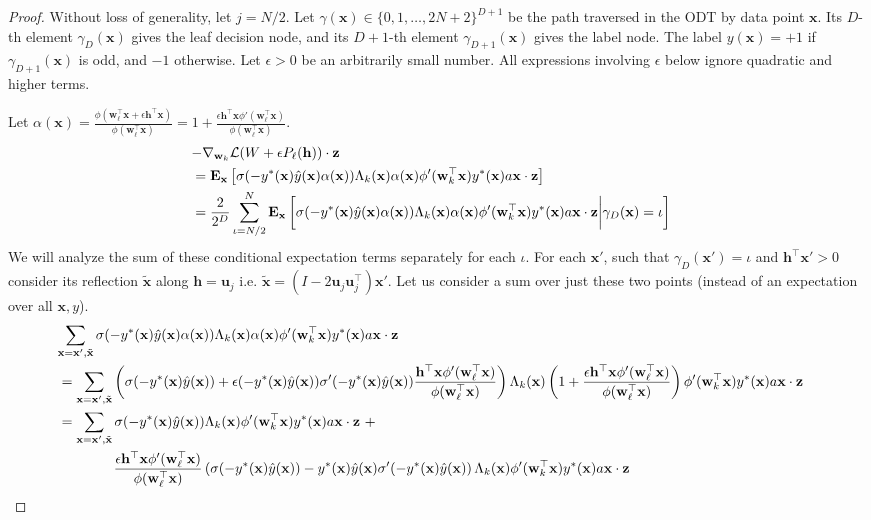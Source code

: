 \documentclass{article}
\theoremstyle{plain}
\theoremstyle{definition}
\theoremstyle{remark}
\newcommand{\E}{{\mathbf E}}
\newcommand{\1}{{\mathbf 1}}
\newcommand{\0}{{\mathbf 0}}
\newcommand{\h}{{\mathbf h}}
\newcommand{\z}{{\mathbf z}}
\newcommand{\w}{{\mathbf w}}
\newcommand{\x}{{\mathbf x}}
\newcommand{\bu}{{\mathbf u}}
\renewcommand{\>}{{\rightarrow}}
\begin{document}
\label{app:second_order_lens}
\begin{proof}
Without loss of generality, let $j=N/2$. Let $\gamma(\x) \in \{0,1,\ldots,2N+2\}^{D+1}$ be the path traversed in the ODT by data point $\x$. Its $D$-th element $\gamma_D(\x)$ gives the leaf decision node, and its $D+1$-th element $\gamma_{D+1}(\x)$ gives the label node. The label $y(\x) =  +1$ if $\gamma_{D+1}(\x)$ is odd, and $-1$ otherwise. Let $\epsilon>0$ be an arbitrarily small number. All expressions involving $\epsilon$ below ignore quadratic and higher terms.

Let $\alpha(\x) = \frac{\phi(\w_{\ell} ^\top \x + \epsilon \h^\top \x)}{\phi(\w_{\ell} ^\top \x)} = 1+\frac{\epsilon \h^\top\x \phi'(\w_\ell^\top \x)}{\phi(\w_\ell^\top \x)}$.
\begin{align}
\lefteqn{-\nabla_{\w_k} \mathcal{L}(W + \epsilon P_\ell(\h)) \cdot \z } \nonumber \\
&= 
\E_{\x} \left[ \sigma (-y^*(\x) \hat y(\x)\alpha(\x)) \Lambda_k(\x) \alpha(\x) \phi'(\w_k^\top \x) y^*(\x)a \x \cdot \z \right] \nonumber  \\
&= \frac{2}{2^D} \sum_{\iota = N/2}^{N}  \E_{\x} \left[ \sigma (-y^*(\x) \hat y(\x)\alpha(\x)) \Lambda_k(\x) \alpha(\x) \phi'(\w_k^\top \x) y^*(\x) a \x \cdot \z  \bigg{|} \gamma_{D}(\x) = \iota \right] \label{eq:second_order_eq1}
\end{align}
We will analyze the sum of these conditional expectation terms separately for each $\iota$. For each $\x'$, such that $\gamma_{D}(\x') = \iota $ and $\h^\top \x' > 0$ consider its reflection $\tilde \x$ along $\h = \bu_j$ i.e. $\tilde\x = (I-2 \bu_j \bu_j^\top)\x'$.  Let us consider a sum over just these two points (instead of an expectation over all $\x,y$).
\begin{align}
\lefteqn{\sum_{\x=\x',\tilde\x} \sigma (-y^*(\x) \hat y(\x)\alpha(\x)) \Lambda_k(\x) \alpha(\x) \phi'(\w_k^\top \x) y^*(\x)a \x \cdot \z } \nonumber  \\
&=
\sum_{\x=\x',\tilde\x} \left(\sigma(-y^*(\x) \hat y(\x))+\epsilon(-y^*(\x) \hat y(\x)) \sigma'(-y^*(\x) \hat y(\x))\frac{\h^\top \x \phi'(\w_\ell^\top \x)}{\phi(\w_\ell^\top \x)} \right) \Lambda_k(\x) \left(1+\frac{\epsilon \h^\top\x \phi'(\w_\ell^\top \x)}{\phi(\w_\ell^\top \x)}\right) \phi'(\w_k^\top \x) y^*(\x) a \x \cdot \z \nonumber  \\
&= \sum_{\x=\x',\tilde\x} \sigma(-y^*(\x) \hat y(\x)) \Lambda_k(\x) \phi'(\w_k^\top \x) y^*(\x)a \x \cdot \z ~ +   \nonumber  \\
& \qquad \qquad \frac{\epsilon \h^\top\x \phi'(\w_\ell^\top \x)}{\phi(\w_\ell^\top \x)}\left( \sigma(-y^*(\x) \hat y(\x))- y^*(\x) \hat y(\x) \sigma'(-y^*(\x) \hat y(\x) \right)\Lambda_k(\x) \phi'(\w_k^\top \x) y^*(\x)a \x \cdot \z  \label{eq:second_order_eq1a} 

\end{align}
\end{proof}
\end{document}
